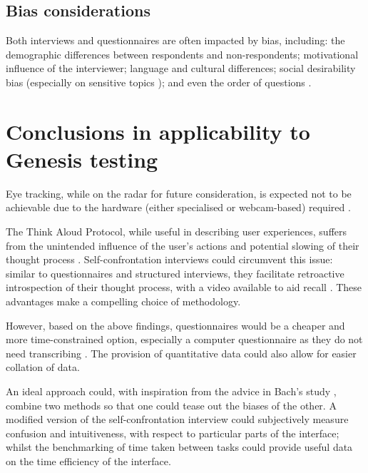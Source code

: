 \documentclass{scrartcl}
\begin{document}
\subsection{Bias considerations}
Both interviews and questionnaires are often impacted by bias, including: the demographic differences between respondents and non-respondents; motivational influence of the interviewer; language and cultural differences; social desirability bias (especially on sensitive topics \cite{sensitivequestions}); and even the order of questions \cite{questionnairebias} \cite{moresurveybias}.

\section{Conclusions in applicability to Genesis testing}
Eye tracking, while on the radar for future consideration, is expected not to be achievable due to the hardware (either specialised or webcam-based) required \cite{poole_eye_2006} \cite{majaranta_chapter_2014} \cite{lowcosttracker}.

The Think Aloud Protocol, while useful in describing user experiences, suffers from the unintended influence of the user's actions and potential slowing of their thought process \cite{e._fonteyn_description_1993} \cite{metcalfe_intuition_1987}. Self-confrontation interviews could circumvent this issue: similar to questionnaires and structured interviews, they facilitate retroactive introspection of their thought process, with a video available to aid recall \cite{cranach_analysis_1982} \cite{lim_self-confrontation_2002}. These advantages make a compelling choice of methodology.

However, based on the above findings, questionnaires would be a cheaper and more time-constrained option, especially a computer questionnaire as they do not need transcribing \cite{computersurveys}. The provision of quantitative data could also allow for easier collation of data.

An ideal approach could, with inspiration from the advice in Bach's study \cite{bach_combining_2011}, combine two methods so that one could tease out the biases of the other. A modified version of the self-confrontation interview could subjectively measure confusion and intuitiveness, with respect to particular parts of the interface; whilst the benchmarking of time taken between tasks could provide useful data on the time efficiency of the interface.

 

\end{document}

